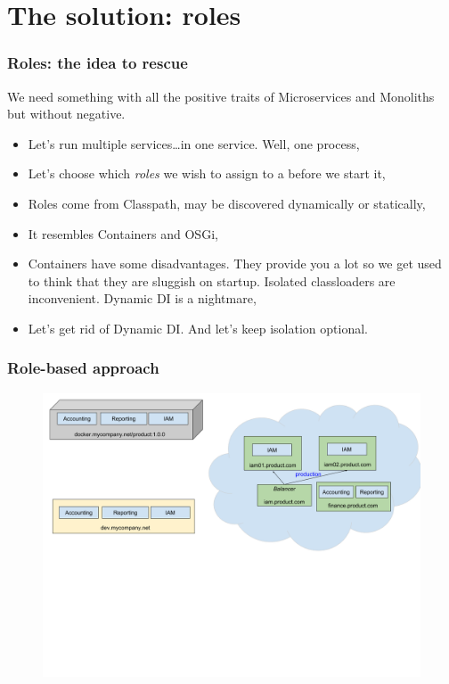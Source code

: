 \documentclass[usenames,dvipsnames]{beamer}
\begin{document}
\section{The solution: roles}

\begin{frame}
\frametitle{Roles: the idea to rescue}
We need something with all the positive traits of Microservices and Monoliths but without negative.
\vspace{0.3cm}
\begin{itemize}
\item Let's run multiple services\dots in one service. Well, one process,
\item Let's choose which \textit{roles} we wish to assign to a before we start it,
\item Roles come from Classpath, may be discovered dynamically or statically,
\item It resembles Containers and OSGi,
\item Containers have some disadvantages. 
      They provide you a lot so we get used to think that they are sluggish on startup.
      Isolated classloaders are inconvenient. Dynamic DI is a nightmare,
\item Let's get rid of Dynamic DI. And let's keep isolation optional.
\end{itemize}
\end{frame}

\begin{frame}
\frametitle{Role-based approach}
\begin{figure}
    \includegraphics[width=\textwidth]{media/role-based-layout.png}
\end{figure}
\end{frame}
\end{document}
